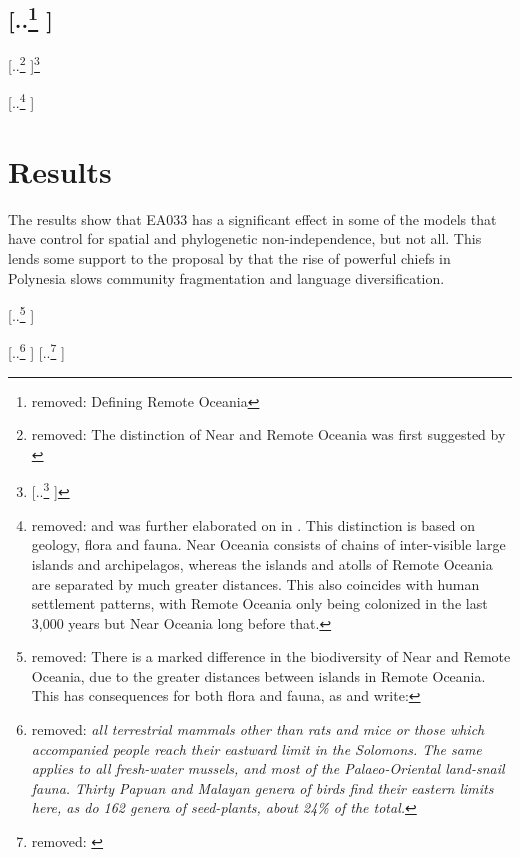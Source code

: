 \documentclass[unnumsec,webpdf,modern,medium]{oup-authoring-template}
\providecommand{\DIFaddtex}[1]{{\protect\color{blue} \sf #1}} %
\providecommand{\DIFdeltex}[1]{{\protect\color{red} [..\footnote{removed: #1} ]}} %
\providecommand{\DIFaddbegin}{} %
\providecommand{\DIFaddend}{} %
\providecommand{\DIFdelbegin}{} %
\providecommand{\DIFdelend}{} %
\providecommand{\DIFadd}[1]{\texorpdfstring{\DIFaddtex{#1}}{#1}} %
\providecommand{\DIFdel}[1]{\texorpdfstring{\DIFdeltex{#1}}{}} %
\newcommand{\DIFscaledelfig}{0.5}
\newlength{\DIFdelgraphicswidth} %
\newlength{\DIFdelgraphicsheight} %
\newcommand{\DIFaddincludegraphics}[2][]{{\color{blue}\fbox{\DIFOincludegraphics[#1]{#2}}}} %
\newcommand{\DIFdelincludegraphics}[2][]{%
\sbox{\DIFdelgraphicsbox}{\DIFOincludegraphics[#1]{#2}}%
\settoboxwidth{\DIFdelgraphicswidth}{\DIFdelgraphicsbox} %
\settoboxtotalheight{\DIFdelgraphicsheight}{\DIFdelgraphicsbox} %
\scalebox{\DIFscaledelfig}{%
\parbox[b]{\DIFdelgraphicswidth}{\usebox{\DIFdelgraphicsbox}\\[-\baselineskip] \rule{\DIFdelgraphicswidth}{0em}}\llap{\resizebox{\DIFdelgraphicswidth}{\DIFdelgraphicsheight}{%
\setlength{\unitlength}{\DIFdelgraphicswidth}%
\begin{picture}(1,1)%
\thicklines\linethickness{2pt} %
{\color[rgb]{1,0,0}\put(0,0){\framebox(1,1){}}}%
{\color[rgb]{1,0,0}\put(0,0){\line( 1,1){1}}}%
{\color[rgb]{1,0,0}\put(0,1){\line(1,-1){1}}}%
\end{picture}%
}\hspace*{3pt}}} %
} %
\DeclareRobustCommand{\DIFaddbegin}{\DIFOaddbegin \let\includegraphics\DIFaddincludegraphics} %
\DeclareRobustCommand{\DIFaddend}{\DIFOaddend \let\includegraphics\DIFOincludegraphics} %
\DeclareRobustCommand{\DIFdelbegin}{\DIFOdelbegin \let\includegraphics\DIFdelincludegraphics} %
\DeclareRobustCommand{\DIFdelend}{\DIFOaddend \let\includegraphics\DIFOincludegraphics} %
\begin{document}
\DIFdelend \FloatBarrier
\DIFdelbegin \subsection{\DIFdel{Defining Remote Oceania}}
\addtocounter{subsection}{-1}%
\DIFdel{The distinction of Near and Remote Oceania was first suggested by \citet{pawley1973dating}}\footnote{\DIFdel{This is the first occurrence of the two terms, although Green wrote earlier papers which included some of the ideas.}} %
\addtocounter{footnote}{-1}%
\DIFdel{and was further elaborated on in \citet{green1991near}. This distinction is based on geology, flora and fauna. Near Oceania consists of chains of inter-visible large islands and archipelagos, whereas the islands and atolls of Remote Oceania are separated by much greater distances. This also coincides with human settlement patterns, with Remote Oceania only being colonized in the last 3,000 years but Near Oceania long before that.
}\DIFdelend \DIFaddbegin \section{\DIFadd{Results}}
\DIFadd{The results show that EA033 has a significant effect in some of the models that have control for spatial and phylogenetic non-independence, but not all. This lends some support to the proposal by \citet{pawley81, pawley2007} that the rise of powerful chiefs in Polynesia slows community fragmentation and language diversification.
}\DIFaddend 

\DIFdelbegin \DIFdel{There is a marked difference in the biodiversity of Near and Remote Oceania, due to the greater distances between islands in Remote Oceania.
This has consequences for both flora and fauna, as \citet{green1991near} and \citet{pawley2007locatingoceanic} write:
}%

\DIFdel{\emph{all terrestrial mammals other than rats and mice or those which accompanied people reach their eastward limit in the Solomons. The same applies to all fresh-water mussels, and most of the Palaeo-Oriental land-snail fauna. Thirty Papuan and Malayan genera of birds find their eastern limits here, as do 162 genera of seed-plants, about 24\% of the total.}
}%
\DIFdel{\citet[495]{green1991near}
}%
\end{document}
